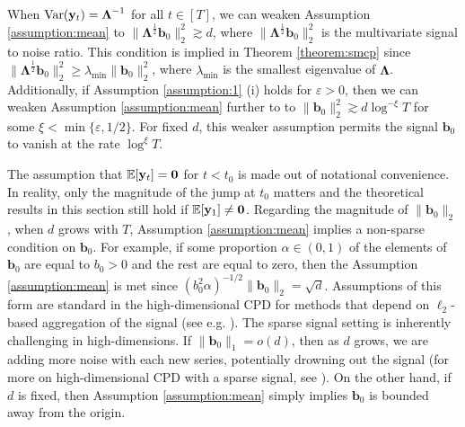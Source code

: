 \begin{remark}\label{rmk:vanishing-signal}
    When $\normalfont{\text{\normalfont Var}}(\mathbf{y}_t) = \boldsymbol{\Lambda}^{-1}$ for all $t \in [T]$, we can weaken Assumption \ref{assumption:mean} to $\lVert \boldsymbol{\Lambda}^{\frac{1}{2}} \mathbf{b}_0\rVert_2^2 \gtrsim d$, where $\lVert \boldsymbol{\Lambda}^{\frac{1}{2}} \mathbf{b}_0\rVert_2^2$ is the multivariate signal to noise ratio. This condition is implied in Theorem \ref{theorem:smcp} since $\lVert \boldsymbol{\Lambda}^{\frac{1}{2}} \mathbf{b}_0\rVert_2^2 \geq \lambda_{\min} \lVert \mathbf{b}_0\rVert_2^2$, where $\lambda_{\min}$ is the smallest eigenvalue of $\boldsymbol{\Lambda}$. Additionally, if Assumption \ref{assumption:1} (i) holds for $\varepsilon > 0$, then we can weaken Assumption \ref{assumption:mean} further to to $\lVert \mathbf{b}_0 \rVert^2_2 \gtrsim d\log^{-\xi} T$ for some $\xi < \min\{\varepsilon, 1/2\}$. For fixed $d$, this weaker assumption permits the signal $\mathbf{b}_0$ to vanish at the rate $\log^{\xi} T$.
\end{remark}
\vspace{-10pt}

The assumption that $\mathbb{E}[\mathbf{y}_t] = \mathbf{0}$ for $t < t_0$ is made out of notational convenience. In reality, only the magnitude of the jump at $t_0$ matters and the theoretical results in this section still hold if $\mathbb{E}[\mathbf{y}_1] \neq \mathbf{0}$. Regarding the magnitude of $\lVert \mathbf{b}_0 \rVert_2$, when $d$ grows with $T$, Assumption \ref{assumption:mean} implies a non-sparse condition on $\mathbf{b}_0$. For example, if some proportion $\alpha \in (0,1)$ of the elements of $\mathbf{b}_0$ are equal to $b_0 > 0$ and the rest are equal to zero, then the Assumption \ref{assumption:mean} is met since $(b^2_0\alpha)^{-1/2}\lVert \mathbf{b}_0 \rVert_2 = \sqrt{d}$. Assumptions of this form are standard in the high-dimensional CPD for methods that depend on $\ell_2$-based aggregation of the signal (see e.g. \citealp{Bai10, Horváth12, Li23}). The sparse signal setting is inherently challenging in high-dimensions. If $\lVert \mathbf{b}_0\rVert_1 = o(d)$, then as $d$ grows, we are adding more noise with each new series, potentially drowning out the signal (for more on high-dimensional CPD with a sparse signal, see \citealp{Cho15, Jirak15, Wang17, Yu21, Chen22}). On the other hand, if $d$ is fixed, then Assumption \ref{assumption:mean} simply implies $\mathbf{b}_0$ is bounded away from the origin.

